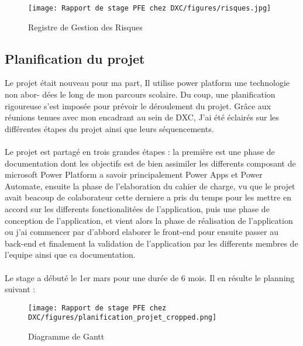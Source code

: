 \begin{figure}[!h]
    \centering
    \texttt{[image: Rapport de stage PFE chez DXC/figures/risques.jpg]}
    \caption{Registre de Gestion des Risques}
\end{figure}

\subsection{Planification du projet}

Le projet était nouveau pour ma part, Il utilise power platform une technologie non abor-
dées le long de mon parcours scolaire. Du coup, une planification rigoureuse s’est imposée
pour prévoir le déroulement du projet. Grâce aux réunions tenues avec mon encadrant au
sein de DXC, J'ai été éclairés sur les différentes étapes du projet ainsi que leurs
séquencements. 
\\
\\
Le projet est partagé en trois grandes étapes : la première est une phase
de documentation dont les objectifs est de bien assimiler les differents composant de microsoft Power Platform a savoir principalement Power Apps et Power Automate, ensuite la phase de l'elaboration du cahier de charge, vu que le projet avait beacoup de colaborateur cette derniere a pris du temps pour les mettre en accord sur les differents fonctionalitées de l'application, puis une phase de conception de l'application, et vient alors la phase de réalisation de l'application ou j'ai commencer par d'abbord elaborer le front-end pour ensuite passer au back-end et finalement la validation de l'application par les differents membres de l'equipe ainsi que ca documentation.
\\
\\
Le stage a débuté le 1er mars pour une durée de 6 mois. Il en résulte le planning
suivant :
\\
\begin{figure}[!h]
    \centering
    \texttt{[image: Rapport de stage PFE chez DXC/figures/planification\_projet\_cropped.png]}
    \caption{Diagramme de Gantt}
\end{figure}

